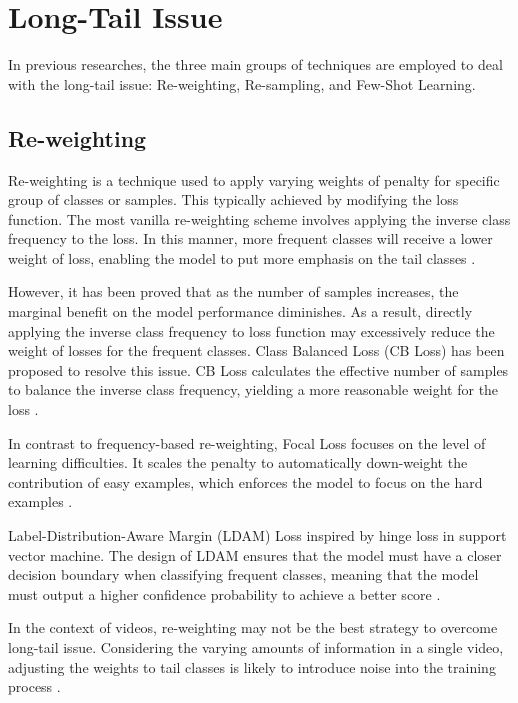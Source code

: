 
\section{Long-Tail Issue}
In previous researches, the three main groups of techniques are employed to deal with the long-tail issue: Re-weighting, Re-sampling, and Few-Shot Learning.

\subsection{Re-weighting}
Re-weighting is a technique used to apply varying weights of penalty for specific group of classes or samples. This typically achieved by modifying the loss function. The most vanilla re-weighting scheme involves applying the inverse class frequency to the loss. In this manner, more frequent classes will receive a lower weight of loss, enabling the model to put more emphasis on the tail classes \parencite{khan2017cost, mostajabi2015feedforward}.

However, it has been proved that as the number of samples increases, the marginal benefit on the model performance diminishes. As a result, directly applying the inverse class frequency to loss function may excessively reduce the weight of losses for the frequent classes. Class Balanced Loss (CB Loss) has been proposed to resolve this issue. CB Loss calculates the effective number of samples to balance the inverse class frequency, yielding a more reasonable weight for the loss \parencite{cui2019class}.

In contrast to frequency-based re-weighting, Focal Loss focuses on the level of learning difficulties. It scales the penalty to automatically down-weight the contribution of easy examples, which enforces the model to focus on the hard examples \parencite{lin2017focal}.

Label-Distribution-Aware Margin (LDAM) Loss inspired by hinge loss in support vector machine. The design of LDAM ensures that the model must have a closer decision boundary when classifying frequent classes, meaning that the model must output a higher confidence probability to achieve a better score \parencite{cao2019learning}.

In the context of videos, re-weighting may not be the best strategy to overcome long-tail issue. Considering the varying amounts of information in a single video, adjusting the weights to tail classes is likely to introduce noise into the training process \parencite{zhang2021videolt}. 

